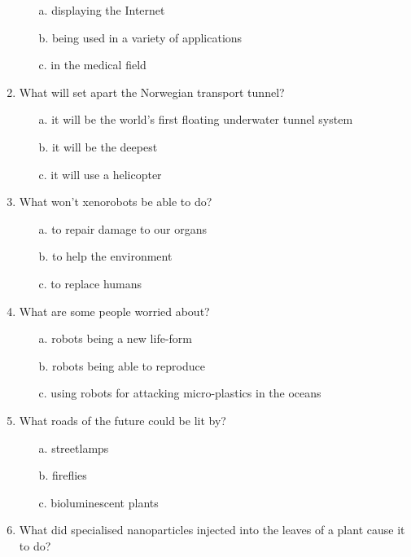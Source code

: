 \begin{enumerate}
            \begin{enumerate}
                  \item[a.] displaying the Internet
                  \item[b.] being used in a variety of applications
                  \item[c.] in the medical field
            \end{enumerate}
      \item What will set apart the Norwegian transport tunnel?
            \begin{enumerate}
                  \item[a.] it will be the world's first floating underwater tunnel system
                  \item[b.] it will be the deepest
                  \item[c.] it will use a helicopter
            \end{enumerate}
      \item What won’t xenorobots be able to do?
            \begin{enumerate}
                  \item[a.] to repair damage to our organs
                  \item[b.] to help the environment
                  \item[c.] to replace humans
            \end{enumerate}
      \item What are some people worried about?
            \begin{enumerate}
                  \item[a.] robots being a new life-form
                  \item[b.] robots being able to reproduce
                  \item[c.] using robots for attacking micro-plastics in the oceans
            \end{enumerate}
      \item What roads of the future could be lit by?
            \begin{enumerate}
                  \item[a.] streetlamps
                  \item[b.] fireflies
                  \item[c.] bioluminescent plants
            \end{enumerate}
      \item What did specialised nanoparticles injected into the leaves of a plant cause it to do?

\end{enumerate}
